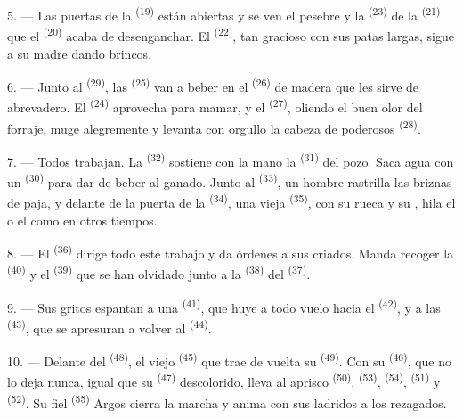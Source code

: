 5. --- Las puertas de la  \textsuperscript{(19)} están abiertas y se ven
el pesebre y la  \textsuperscript{(23)} de la 
\textsuperscript{(21)} que el  \textsuperscript{(20)} acaba de
desenganchar. El  \textsuperscript{(22)}, tan gracioso con sus patas
largas, sigue a su madre dando brincos.

6. --- Junto al  \textsuperscript{(29)}, las 
\textsuperscript{(25)} van a beber en el  \textsuperscript{(26)} de madera que
les sirve de abrevadero. El  \textsuperscript{(24)} aprovecha para
mamar, y el  \textsuperscript{(27)}, oliendo el buen olor del forraje,
muge alegremente y levanta con orgullo la cabeza de poderosos
 \textsuperscript{(28)}.

7. --- Todos trabajan. La  \textsuperscript{(32)} sostiene con la mano
la  \textsuperscript{(31)} del pozo. Saca agua con un 
\textsuperscript{(30)} para dar de beber al ganado. Junto al 
\textsuperscript{(33)}, un hombre rastrilla las briznas de paja, y delante de la
puerta de la  \textsuperscript{(34)}, una vieja 
\textsuperscript{(35)}, con su rueca y su , hila el  o el
 como en otros tiempos.

\VUsaut{3.0mm}
\VUsaut{3.0mm}

8. --- El  \textsuperscript{(36)} dirige todo este trabajo y da
órdenes a sus criados. Manda recoger la  \textsuperscript{(40)} y el
 \textsuperscript{(39)} que se han olvidado junto a la 
\textsuperscript{(38)} del  \textsuperscript{(37)}.

9. --- Sus gritos espantan a una  \textsuperscript{(41)}, que huye a
todo vuelo hacia el  \textsuperscript{(42)}, y a las 
\textsuperscript{(43)}, que se apresuran a volver al 
\textsuperscript{(44)}.

10. --- Delante del  \textsuperscript{(48)}, el viejo
 \textsuperscript{(45)} que trae de vuelta su 
\textsuperscript{(49)}. Con su  \textsuperscript{(46)}, que no lo deja nunca,
igual que su  \textsuperscript{(47)} descolorido, lleva al aprisco
 \textsuperscript{(50)},  \textsuperscript{(53)},
 \textsuperscript{(54)},  \textsuperscript{(51)} y
 \textsuperscript{(52)}. Su fiel  \textsuperscript{(55)} Argos
cierra la marcha y anima con sus ladridos a los rezagados.

